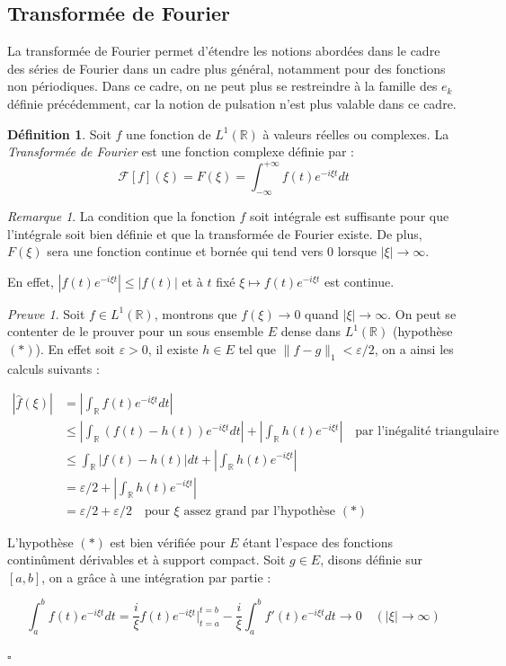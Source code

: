 \documentclass[]{article}
\theoremstyle{remark}
\newtheorem{myrem}{Remarque}
\newtheorem{myproof}{Preuve}
\theoremstyle{definition}
\newtheorem{mydef}{Définition}
\newcommand{\cqfd}{
	\hfill$\square$
}
\begin{document}
	\subsection{Transformée de Fourier}
		La transformée de Fourier permet d'étendre les notions abordées dans le cadre des séries de Fourier dans un cadre plus général, notamment pour des fonctions non périodiques. 
		Dans ce cadre, on ne peut plus se restreindre à la famille des $e_k$ définie précédemment, car la notion de pulsation n'est plus valable dans ce cadre. 
	
	\begin{mydef}
		Soit $f$ une fonction de $L^1(\mathbb{R})$ à valeurs réelles ou complexes. La \textit{Transformée de Fourier} est une fonction complexe définie par :
		$$ \mathcal{F}[f](\xi) = F(\xi)= \int_{-\infty}^{+\infty}f(t)e^{-i\xi t}dt $$ 
	\end{mydef}

	\begin{myrem}
		La condition que la fonction $f$ soit intégrale est suffisante pour que l'intégrale soit bien définie et que la transformée de Fourier existe. 
		De plus, $F(\xi)$ sera une fonction continue et bornée qui tend vers 0 lorsque $|\xi| \longrightarrow \infty$.
		
		En effet, $|f(t)e^{-i \xi t}| \leqslant |f(t)|$ et à $t$ fixé $\xi \mapsto f(t) e^{- i \xi t}$ est continue.
	\end{myrem}
	
	\begin{myproof}
		Soit $f \in L^1(\mathbb{R})$, montrons que $f(\xi) \to 0$ quand $|\xi| \to \infty$. On peut se contenter de le prouver pour un sous ensemble $E$ dense dans $L^1(\mathbb{R})$ (hypothèse $(*)$). En effet soit $\varepsilon > 0$, il existe $h \in E$ tel que $\|f - g\|_1 < \varepsilon / 2$, on a ainsi les calculs suivants :
		
		\begin{align*}
			|\hat{f}(\xi)| & = \left|\int_\mathbb{R} f(t) e^{-i \xi t} dt\right| \\
			& \leqslant \left|\int_\mathbb{R} (f(t) - h(t))e^{- i \xi t} dt\right| + \left|\int_\mathbb{R} h(t) e^{- i \xi t}\right| \quad \text{par l'inégalité triangulaire} \\
			& \leqslant \int_{\mathbb{R}} |f(t) - h(t)| dt + \left|\int_\mathbb{R} h(t) e^{- i \xi t}\right| \\
			&= \varepsilon / 2 + \left|\int_\mathbb{R} h(t) e^{- i \xi t}\right| \\
			&= \varepsilon/2 + \varepsilon/2 \quad \text{pour $\xi$ assez grand par l'hypothèse } (*)
		\end{align*}
		
		L'hypothèse $(*)$ est bien vérifiée pour $E$ étant l'espace des fonctions continûment dérivables et à support compact. Soit $g \in E$, disons définie sur $[a, b]$, on a grâce à une intégration par partie :
		
		$$\int_{a}^{b} f(t) e^{- i \xi t} dt = \frac{i}{\xi} f(t) e^{- i \xi t} \bigg\vert_{t = a}^{t=b} - \frac{i}{\xi} \int_{a}^{b} f'(t) e^{- i \xi t} dt \longrightarrow 0 \quad (|\xi| \to \infty)$$
		
		\cqfd
	\end{myproof}
	
\end{document}
